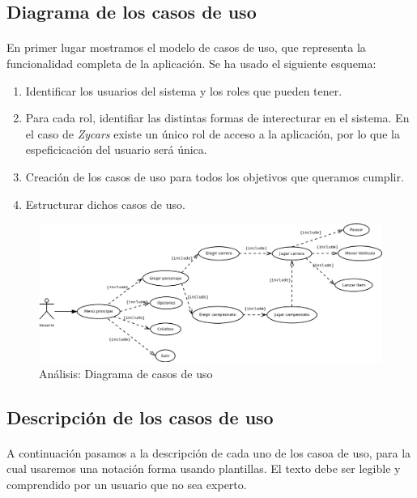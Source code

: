 \subsection{Diagrama de los casos de uso}

\paragraph{}
En primer lugar mostramos el modelo de casos de uso, que representa la funcionalidad completa de la aplicación. Se ha usado el 
siguiente esquema:

\begin{enumerate}
    \item Identificar los usuarios del sistema y los roles que pueden tener.
    \item Para cada rol, identifiar las distintas formas de interecturar en el sistema. En el caso de \emph{Zycars} existe
    un único rol de acceso a la aplicación, por lo que la espeficicación del usuario será única.
    \item Creación de los casos de uso para todos los objetivos que queramos cumplir.
    \item Estructurar dichos casos de uso.
\end{enumerate}

\begin{figure}[H]
  \label{diagrama_casos_uso}
  \begin{flushleft}
    \includegraphics[scale=0.45]{imagenes/diagrama_casos.png}
  \end{flushleft}
  \caption{Análisis: Diagrama de casos de uso}
\end{figure}

\subsection{Descripción de los casos de uso}

\paragraph{}
A continuación pasamos a la descripción de cada uno de los casoa de uso, para la cual usaremos una notación forma usando plantillas.
El texto debe ser legible y comprendido por un usuario que no sea experto.

